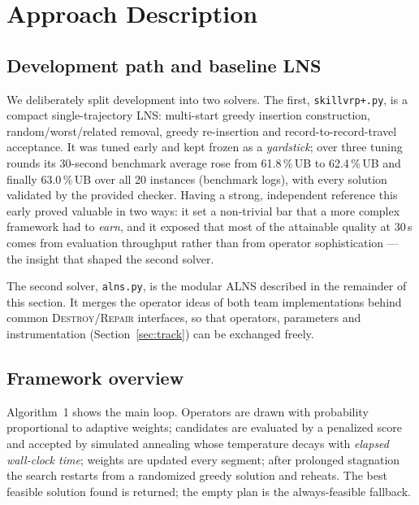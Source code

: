 \documentclass[10pt, a4paper]{article}
\newcommand{\ub}{\%\,UB}
\begin{document}
\section{Approach Description}\label{sec:method}

\subsection{Development path and baseline LNS}\label{sec:baseline-dev}
We deliberately split development into two solvers. The first,
\texttt{skillvrp+.py}, is a compact single-trajectory LNS: multi-start
greedy insertion construction, random/worst/related removal, greedy
re-insertion and record-to-record-travel acceptance. It was tuned early and
kept frozen as a \emph{yardstick}; over three tuning rounds its 30-second
benchmark average rose from 61.8\,\ub{} to 62.4\,\ub{} and finally
63.0\,\ub{} over all 20 instances (benchmark logs), with every solution
validated by the provided checker. Having a strong, independent reference
this early proved valuable in two ways: it set a non-trivial bar that a more
complex framework had to \emph{earn}, and it exposed that most of the
attainable quality at 30\,s comes from evaluation throughput rather than
from operator sophistication --- the insight that shaped the second solver.

The second solver, \texttt{alns.py}, is the modular ALNS described in the
remainder of this section. It merges the operator ideas of both team
implementations behind common \textsc{Destroy}/\textsc{Repair} interfaces,
so that operators, parameters and instrumentation (Section~\ref{sec:track})
can be exchanged freely.

\subsection{Framework overview}
Algorithm~1 shows the main loop. Operators are drawn with probability
proportional to adaptive weights; candidates are evaluated by a penalized
score and accepted by simulated annealing whose temperature decays with
\emph{elapsed wall-clock time}; weights are updated every segment; after
prolonged stagnation the search restarts from a randomized greedy solution
and reheats. The best feasible solution found is returned; the empty plan is
the always-feasible fallback.
\end{document}
